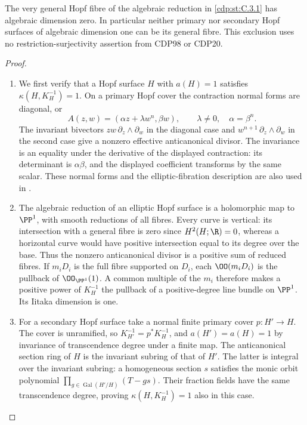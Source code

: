\begin{proposition}\hypertarget{tag-01FE}{}\label{cdp:st:C.3.8}


The very general Hopf fibre of the algebraic reduction in \ref{cdp:st:C.3.1}
has algebraic dimension zero. In particular neither primary nor
secondary Hopf surfaces of algebraic dimension one can be its
general fibre. This exclusion uses no restriction-surjectivity
assertion from CDP98 or CDP20.
\end{proposition}


\begin{proof}

\begin{enumerate}[label={$\langle1\rangle$\arabic*.},leftmargin=*]
\item We first verify that a Hopf surface $H$ with $a(H)=1$ satisfies
$\kappa(H,K_H^{-1})=1$. On a primary Hopf cover the contraction
normal forms are diagonal, or
\[
A(z,w)=(\alpha z+\lambda w^n,\beta w),\qquad
\lambda\ne0,\quad \alpha=\beta^n.
\]
The invariant bivectors $zw\,\partial_z\wedge\partial_w$ in the
diagonal case and $w^{n+1}\,\partial_z\wedge\partial_w$ in the
second case give a nonzero effective anticanonical divisor.
The invariance is an equality under the derivative of the
displayed contraction: its determinant is $\alpha\beta$, and
the displayed coefficient transforms by the same scalar.
These normal forms and the elliptic-fibration description are
also used in \cite[Proposition~3.1 and its proof]{SS2002}.

\item The algebraic reduction of an elliptic Hopf surface is a
holomorphic map to $\PP^1$, with smooth reductions of all fibres.
Every curve is vertical: its intersection with a general fibre
is zero since $H^2(H;\R)=0$, whereas a horizontal curve would
have positive intersection equal to its degree over the base.
Thus the nonzero anticanonical divisor is a positive sum of
reduced fibres. If $m_iD_i$ is the full fibre supported on
$D_i$, each $\OO(m_iD_i)$ is the pullback of $\OO_{\PP^1}(1)$.
A common multiple of the $m_i$ therefore makes a positive power
of $K_H^{-1}$ the pullback of a positive-degree line bundle on
$\PP^1$. Its Iitaka dimension is one.

\item For a secondary Hopf surface take a normal finite primary cover
$p:H'\to H$. The cover is unramified, so
$K_{H'}^{-1}=p^*K_H^{-1}$, and $a(H')=a(H)=1$ by invariance of
transcendence degree under a finite map. The anticanonical
section ring of $H$ is the invariant subring of that of $H'$.
The latter is integral over the invariant subring: a homogeneous
section $s$ satisfies the monic orbit polynomial
$\prod_{g\in\operatorname{Gal}(H'/H)}(T-gs)$. Their fraction
fields have the same transcendence degree, proving
$\kappa(H,K_H^{-1})=1$ also in this case.


\end{enumerate}
\end{proof}
